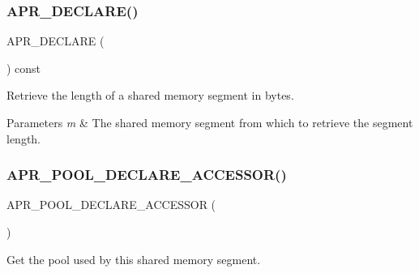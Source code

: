 \subsubsection{\texorpdfstring{A\+P\+R\+\_\+\+D\+E\+C\+L\+A\+R\+E()}{APR\_DECLARE()}\hspace{0.1cm}{\footnotesize\ttfamily [3/3]}}
{\footnotesize\ttfamily A\+P\+R\+\_\+\+D\+E\+C\+L\+A\+RE (\begin{DoxyParamCaption}\item[{apr\+\_\+size\+\_\+t}]{ }\end{DoxyParamCaption}) const}

Retrieve the length of a shared memory segment in bytes. 
\begin{DoxyParams}{Parameters}
{\em m} & The shared memory segment from which to retrieve the segment length. \\
\hline
\end{DoxyParams}
\mbox{\label{group__apr__shm_ga2f33ef81c957af596afa3417a4748d3e}} 
\subsubsection{\texorpdfstring{A\+P\+R\+\_\+\+P\+O\+O\+L\+\_\+\+D\+E\+C\+L\+A\+R\+E\+\_\+\+A\+C\+C\+E\+S\+S\+O\+R()}{APR\_POOL\_DECLARE\_ACCESSOR()}}
{\footnotesize\ttfamily A\+P\+R\+\_\+\+P\+O\+O\+L\+\_\+\+D\+E\+C\+L\+A\+R\+E\+\_\+\+A\+C\+C\+E\+S\+S\+OR (\begin{DoxyParamCaption}\item[{shm}]{ }\end{DoxyParamCaption})}

Get the pool used by this shared memory segment. 